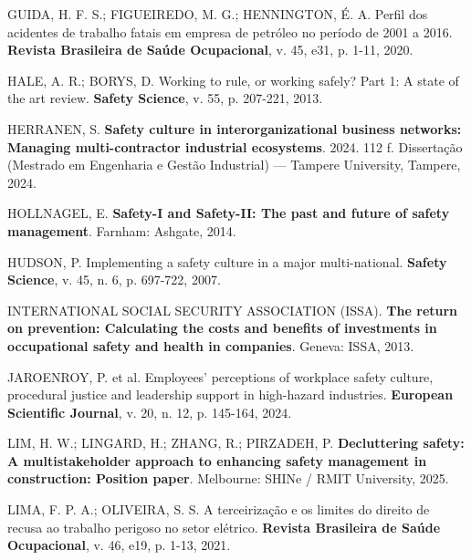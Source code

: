 \documentclass[12pt,a4paper]{article}
\begin{document}
\vspace{0.25cm}
\noindent GUIDA, H. F. S.; FIGUEIREDO, M. G.; HENNINGTON, É. A. Perfil dos acidentes de trabalho fatais em empresa de petróleo no período de 2001 a 2016. \textbf{Revista Brasileira de Saúde Ocupacional}, v. 45, e31, p. 1-11, 2020.

\vspace{0.25cm}
\noindent HALE, A. R.; BORYS, D. Working to rule, or working safely? Part 1: A state of the art review. \textbf{Safety Science}, v. 55, p. 207-221, 2013.

\vspace{0.25cm}
\noindent HERRANEN, S. \textbf{Safety culture in interorganizational business networks: Managing multi-contractor industrial ecosystems}. 2024. 112 f. Dissertação (Mestrado em Engenharia e Gestão Industrial) — Tampere University, Tampere, 2024.

\vspace{0.25cm}
\noindent HOLLNAGEL, E. \textbf{Safety-I and Safety-II: The past and future of safety management}. Farnham: Ashgate, 2014.

\vspace{0.25cm}
\noindent HUDSON, P. Implementing a safety culture in a major multi-national. \textbf{Safety Science}, v. 45, n. 6, p. 697-722, 2007.

\vspace{0.25cm}
\noindent INTERNATIONAL SOCIAL SECURITY ASSOCIATION (ISSA). \textbf{The return on prevention: Calculating the costs and benefits of investments in occupational safety and health in companies}. Geneva: ISSA, 2013.

\vspace{0.25cm}
\noindent JAROENROY, P. et al. Employees' perceptions of workplace safety culture, procedural justice and leadership support in high-hazard industries. \textbf{European Scientific Journal}, v. 20, n. 12, p. 145-164, 2024.

\vspace{0.25cm}
\noindent LIM, H. W.; LINGARD, H.; ZHANG, R.; PIRZADEH, P. \textbf{Decluttering safety: A multistakeholder approach to enhancing safety management in construction: Position paper}. Melbourne: SHINe / RMIT University, 2025.

\vspace{0.25cm}
\noindent LIMA, F. P. A.; OLIVEIRA, S. S. A terceirização e os limites do direito de recusa ao trabalho perigoso no setor elétrico. \textbf{Revista Brasileira de Saúde Ocupacional}, v. 46, e19, p. 1-13, 2021.
\end{document}
